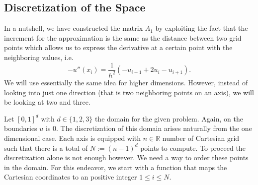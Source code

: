 \subsection{Discretization of the Space}

In a nutshell, we have constructed the matrix \(A_1\) by exploiting the fact that the increment for the approximation is the same as the distance between two grid points which allows us to express the derivative at a certain point with the neighboring values, i.e.
\[
-u''(x_i) = \frac{1}{h^2} (-u_{i - 1} + 2 u_i - u_{i + 1}) \text{.}
\]
We will use essentially the same idea for higher dimensions. However, instead of looking into just one direction (that is two neighboring points on an axis), we will be looking at two and three.

Let \([0,1]^{d}\) with \(d \in \{1, 2, 3\}\) the domain for the given problem. Again, on the boundaries \(u\) is \(0\). The discretization of this domain arises naturally from the one dimensional case. Each axis is equipped with \(n \in \mathbb{R}\) number of Cartesian grid such that there is a total of \( N := (n-1)^d\) points to compute. To proceed the discretization alone is not enough however. We need a way to order these points in the domain. For this endeavor, we start with a function that maps the Cartesian coordinates to an positive integer \(1 \leq i \leq N\).

